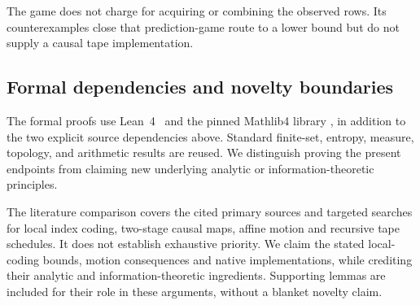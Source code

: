 The game does not charge for acquiring or combining the observed rows.
Its counterexamples close that prediction-game route to a lower bound but
do not supply a causal tape implementation.

\subsection{Formal dependencies and novelty boundaries}

The formal proofs use Lean~4~\cite{Lean4} and the pinned Mathlib4 library
\cite{Mathlib2020,Mathlib4}, in addition to the two explicit source dependencies
above. Standard finite-set, entropy, measure, topology, and arithmetic
results are reused. We distinguish proving the present endpoints from
claiming new underlying analytic or information-theoretic principles.

The literature comparison covers the cited primary sources and targeted
searches for local index coding, two-stage causal maps, affine motion and
recursive tape schedules. It does not establish exhaustive priority. We
claim the stated local-coding bounds, motion consequences and native
implementations, while crediting their analytic and information-theoretic
ingredients. Supporting lemmas are included for their role in these arguments,
without a blanket novelty claim.
